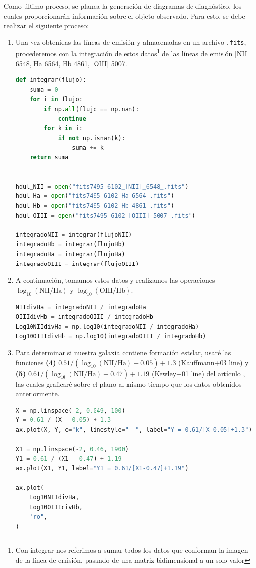 \documentclass[9pt,twocolumn,a4paper]{opticajnl}
\begin{document}
Como último proceso, se planea la generación de diagramas de diagnóstico, los cuales proporcionarán información sobre el objeto observado. Para esto, se debe realizar el siguiente proceso:
\begin{enumerate}
  \item Una vez obtenidas las líneas de emisión y almacenadas en un archivo \texttt{.fits}, procederemos con la integración de estos datos\footnote{Con integrar nos referimos a sumar todos los datos que conforman la imagen de la línea de emisión, pasando de una matriz bidimensional a un solo valor} de las líneas de emisión [NII] 6548, Ha 6564, Hb 4861, [OIII] 5007.
    \begin{lstlisting}[language=Python]
def integrar(flujo):
    suma = 0
    for i in flujo:
        if np.all(flujo == np.nan):
            continue
        for k in i:
            if not np.isnan(k):
                suma += k
    return suma


hdul_NII = open("fits7495-6102_[NII]_6548_.fits")
hdul_Ha = open("fits7495-6102_Ha_6564_.fits")
hdul_Hb = open("fits7495-6102_Hb_4861_.fits")
hdul_OIII = open("fits7495-6102_[OIII]_5007_.fits")

integradoNII = integrar(flujoNII)
integradoHb = integrar(flujoHb)
integradoHa = integrar(flujoHa)
integradoOIII = integrar(flujoOIII)
    \end{lstlisting}
    
  \item A continuación, tomamos estos datos y realizamos las operaciones \(\log_{10}(\text{NII}/\text{Ha})\) y \(\log_{10}(\text{OIII}/\text{Hb})\).
    \begin{lstlisting}[language=Python]
NIIdivHa = integradoNII / integradoHa
OIIIdivHb = integradoOIII / integradoHb
Log10NIIdivHa = np.log10(integradoNII / integradoHa)
Log10OIIIdivHb = np.log10(integradoOIII / integradoHb)
    \end{lstlisting}
  \item Para determinar si nuestra galaxia contiene formación estelar, usaré las funciones \textbf{(4)} \(0.61 / (\log_{10}(\text{NII}/\text{Ha}) - 0.05) + 1.3\) (Kauffmann+03 line) y \textbf{(5)} \(0.61 / (\log_{10}(\text{NII}/\text{Ha}) - 0.47) + 1.19\) (Kewley+01 line) del artículo \cite{2006MNRAS.372..961K}, las cuales graficaré sobre el plano al mismo tiempo que los datos obtenidos anteriormente.
    \begin{lstlisting}[language=Python]
X = np.linspace(-2, 0.049, 100)
Y = 0.61 / (X - 0.05) + 1.3
ax.plot(X, Y, c="k", linestyle="--", label="Y = 0.61/[X-0.05]+1.3")

X1 = np.linspace(-2, 0.46, 1900)
Y1 = 0.61 / (X1 - 0.47) + 1.19
ax.plot(X1, Y1, label="Y1 = 0.61/[X1-0.47]+1.19")

ax.plot(
    Log10NIIdivHa,
    Log10OIIIdivHb,
    "ro",
)
    \end{lstlisting}
\end{enumerate}                                                                  
\end{document}
